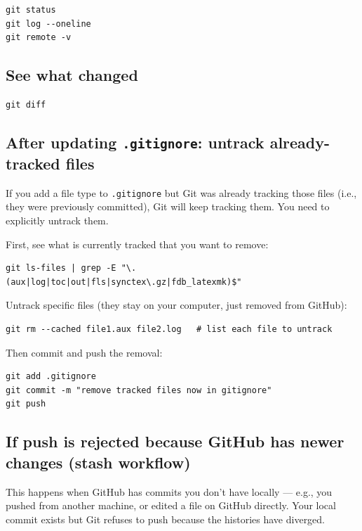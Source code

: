 \documentclass[11pt]{article}
\begin{document}
\begin{lstlisting}[style=bash]
git status
git log --oneline
git remote -v
\end{lstlisting}

\subsection{See what changed}

\begin{lstlisting}[style=bash]
git diff
\end{lstlisting}

\subsection{After updating \texttt{.gitignore}: untrack already-tracked files}

If you add a file type to \texttt{.gitignore} but Git was already tracking those files (i.e., they were previously committed), Git will keep tracking them. You need to explicitly untrack them.

First, see what is currently tracked that you want to remove:

\begin{lstlisting}[style=bash]
git ls-files | grep -E "\.(aux|log|toc|out|fls|synctex\.gz|fdb_latexmk)$"
\end{lstlisting}

Untrack specific files (they stay on your computer, just removed from GitHub):

\begin{lstlisting}[style=bash]
git rm --cached file1.aux file2.log   # list each file to untrack
\end{lstlisting}

Then commit and push the removal:

\begin{lstlisting}[style=bash]
git add .gitignore
git commit -m "remove tracked files now in gitignore"
git push
\end{lstlisting}

\subsection{If push is rejected because GitHub has newer changes (stash workflow)}

This happens when GitHub has commits you don't have locally --- e.g., you pushed from another machine, or edited a file on GitHub directly. Your local commit exists but Git refuses to push because the histories have diverged.
\end{document}
